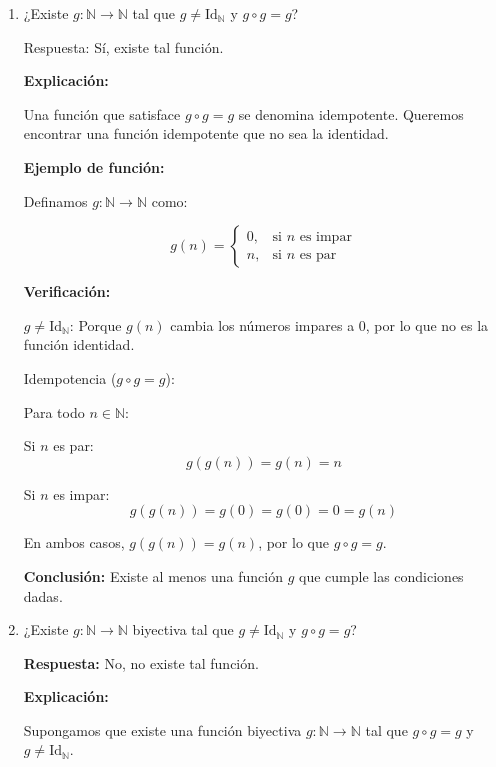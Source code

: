 \begin{solution}
    \begin{enumerate}
      \item ¿Existe \( g : \mathbb{N} \rightarrow \mathbb{N} \) tal que \( g \neq \text{Id}_{\mathbb{N}} \) y \( g \circ g = g \)?
      
      Respuesta: Sí, existe tal función.
      
      \textbf{Explicación:}
      
      Una función que satisface \( g \circ g = g \) se denomina idempotente. Queremos encontrar una función idempotente que no sea la identidad.
      
      \textbf{Ejemplo de función:}
      
      Definamos \( g : \mathbb{N} \rightarrow \mathbb{N} \) como:
      
      \[
      g(n) = \begin{cases}
      0, & \text{si } n \text{ es impar} \\
      n, & \text{si } n \text{ es par}
      \end{cases}
      \]
      
      \textbf{Verificación:}
      
      \( g \neq \text{Id}_{\mathbb{N}} \): Porque \( g(n) \) cambia los números impares a 0, por lo que no es la función identidad.
        
      Idempotencia (\( g \circ g = g \)):
      
      Para todo \( n \in \mathbb{N} \):
      
      Si \( n \) es par:
          \[
          g(g(n)) = g(n) = n
          \]

      Si \( n \) es impar:
          \[
          g(g(n)) = g(0) = g(0) = 0 = g(n)
          \]
      
      En ambos casos, \( g(g(n)) = g(n) \), por lo que \( g \circ g = g \).
      
      \textbf{Conclusión:} Existe al menos una función \( g \) que cumple las condiciones dadas.
      
      \item ¿Existe \( g : \mathbb{N} \rightarrow \mathbb{N} \) biyectiva tal que \( g \neq \text{Id}_{\mathbb{N}} \) y \( g \circ g = g \)?
      
      \textbf{Respuesta:} No, no existe tal función.
      
      \textbf{Explicación:}
      
      Supongamos que existe una función biyectiva \( g : \mathbb{N} \rightarrow \mathbb{N} \) tal que \( g \circ g = g \) y \( g \neq \text{Id}_{\mathbb{N}} \).
      

\end{enumerate}
\end{solution}
